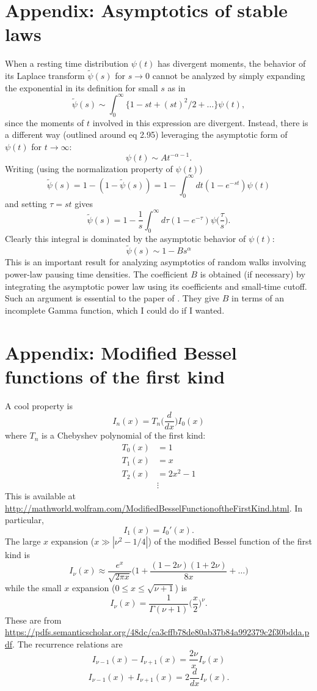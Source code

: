 \documentclass[11pt]{article}
\newcommand\be{\begin{equation}} %
\newcommand\ee{\end{equation}}   %
\begin{document}
\section*{Appendix: Asymptotics of stable laws}
When a resting time distribution $\psi(t)$ has divergent moments, the behavior of its Laplace transform $\tilde{\psi}(s)$ for $s\rightarrow0$ cannot be analyzed by simply expanding the exponential in its definition for small $s$ as in 
\be \tilde{\psi}(s) \sim \int_0^\infty \{1-st + (st)^2/2 + \dots \} \psi(t),\ee
since the moments of $t$ involved in this expression are divergent. 
Instead, there is a different way (outlined around \citet{Weiss1994} eq 2.95) leveraging the asymptotic form of $\psi(t)$ for $t\rightarrow \infty$:
\be \psi(t) \sim  A t^{-\alpha-1}.\ee
Writing (using the normalization property of $\psi(t)$)
\be \tilde{\psi}(s) = 1 - (1- \tilde{\psi}(s)) = 1 - \int_0^\infty dt (1-e^{-st})\psi(t) \ee
and setting $\tau = st$ gives
\be \tilde{\psi}(s) = 1 - \frac{1}{s} \int_0^\infty d\tau (1-e^{-\tau})\psi\big(\frac{\tau}{s}\big).\ee
Clearly this integral is dominated by the asymptotic behavior of $\psi(t)$:
\be \tilde{\psi}(s) \sim 1 - B s^\alpha \ee
This is an important result for analyzing asymptotics of random walks involving power-law pausing time densities.
The coefficient $B$ is obtained (if necessary) by integrating the asymptotic power law using its coefficients and small-time cutoff.
Such an argument is essential to the paper of \citet{Weeks1998}. They give $B$ in terms of an incomplete Gamma function, which I could do if I wanted.

\section*{Appendix: Modified Bessel functions of the first kind}
A cool property is 
\be I_n(x) = T_n\Big(\frac{d}{dx}\Big)I_0(x)\ee
where $T_n$ is a Chebyshev polynomial of the first kind:
\begin{align}
T_0(x) &= 1 \\
T_1(x) &= x \\
T_2(x) &= 2x^2 -1 \\
&\vdots
\end{align}
This is available at \url{http://mathworld.wolfram.com/ModifiedBesselFunctionoftheFirstKind.html}.
In particular, 
\be I_1(x) = I_0'(x).\ee
The large $x$ expansion ($x\gg | \nu^2-1/4|$) of the modified Bessel function of the first kind is 
\be I_\nu(x) \approx \frac{e^x}{\sqrt{2\pi x}}\Big(1 + \frac{(1-2\nu)(1+2\nu)}{8x} + \dots \Big)\ee
while the small $x$ expansion ($0\leq x \leq \sqrt{\nu+1}$) is
\be I_\nu(x) = \frac{1}{\Gamma(\nu+ 1)}\Big(\frac{x}{2}\Big)^\nu.\ee
These are from \url{https://pdfs.semanticscholar.org/48dc/ca3cffb78de80ab37b84a992379c2f30bdda.pdf}.
The recurrence relations are
\be I_{\nu-1}(x) - I_{\nu+1}(x) = \frac{2\nu}{x}I_\nu(x)\ee
\be I_{\nu-1}(x) + I_{\nu+1}(x) = 2\frac{d}{dx}I_\nu(x).\ee

\end{document}
